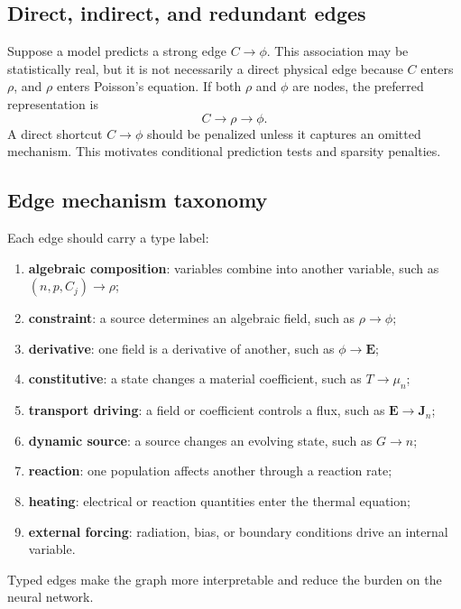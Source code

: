 \documentclass[11pt]{article}
\newcommand{\Evec}{\bm{E}}
\newcommand{\Jvec}{\bm{J}}
\begin{document}
\subsection{Direct, indirect, and redundant edges}

Suppose a model predicts a strong edge \(C\rightarrow\phi\). This association may be statistically real, but it is not necessarily a direct physical edge because \(C\) enters \(\rho\), and \(\rho\) enters Poisson's equation. If both \(\rho\) and \(\phi\) are nodes, the preferred representation is
\begin{equation}
C\rightarrow\rho\rightarrow\phi.
\end{equation}
A direct shortcut \(C\rightarrow\phi\) should be penalized unless it captures an omitted mechanism. This motivates conditional prediction tests and sparsity penalties.

\subsection{Edge mechanism taxonomy}

Each edge should carry a type label:
\begin{enumerate}[leftmargin=1.6em]
    \item \textbf{algebraic composition}: variables combine into another variable, such as \((n,p,C_j)\rightarrow\rho\);
    \item \textbf{constraint}: a source determines an algebraic field, such as \(\rho\rightarrow\phi\);
    \item \textbf{derivative}: one field is a derivative of another, such as \(\phi\rightarrow\Evec\);
    \item \textbf{constitutive}: a state changes a material coefficient, such as \(T\rightarrow\mu_n\);
    \item \textbf{transport driving}: a field or coefficient controls a flux, such as \(\Evec\rightarrow\Jvec_n\);
    \item \textbf{dynamic source}: a source changes an evolving state, such as \(G\rightarrow n\);
    \item \textbf{reaction}: one population affects another through a reaction rate;
    \item \textbf{heating}: electrical or reaction quantities enter the thermal equation;
    \item \textbf{external forcing}: radiation, bias, or boundary conditions drive an internal variable.
\end{enumerate}
Typed edges make the graph more interpretable and reduce the burden on the neural network.
\end{document}
